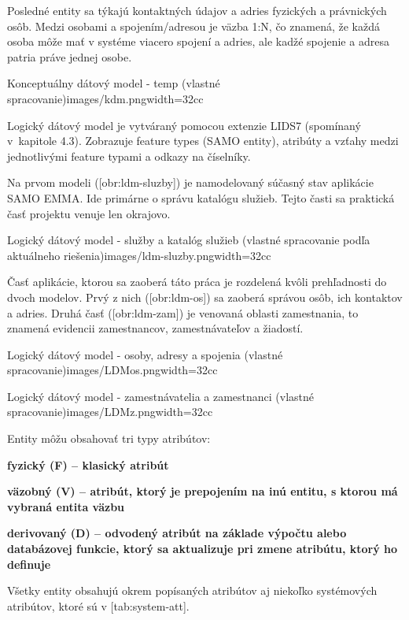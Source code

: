 Posledné entity sa týkajú kontaktných údajov a adries fyzických a právnických osôb. Medzi osobami a spojením/adresou je väzba 1:N, čo znamená, že každá osoba môže mať v systéme viacero spojení a adries, ale kadžé spojenie a adresa patria práve jednej osobe.


{Konceptuálny dátový model - temp (vlastné spracovanie)}{images/kdm.png}{width=32cc}

Logický dátový model je vytváraný pomocou extenzie LIDS7 (spomínaný v~kapitole 4.3). Zobrazuje feature types (SAMO entity), atribúty a vzťahy medzi jednotlivými feature typami a odkazy na číselníky.

Na prvom modeli ([obr:ldm-sluzby]) je namodelovaný súčasný stav aplikácie SAMO EMMA. Ide primárne o správu katalógu služieb. Tejto časti sa praktická časť projektu venuje len okrajovo.

{Logický dátový model - služby a katalóg služieb (vlastné spracovanie podľa aktuálneho riešenia)}{images/ldm-sluzby.png}{width=32cc}

Časť aplikácie, ktorou sa zaoberá táto práca je rozdelená kvôli prehľadnosti do dvoch modelov. Prvý z nich ([obr:ldm-os]) sa zaoberá správou osôb, ich kontaktov a adries. Druhá časť ([obr:ldm-zam]) je venovaná oblasti zamestnania, to znamená evidencii zamestnancov, zamestnávateľov a žiadostí.

{Logický dátový model - osoby, adresy a spojenia (vlastné spracovanie)}{images/LDMos.png}{width=32cc}

{Logický dátový model - zamestnávatelia a zamestnanci (vlastné spracovanie)}{images/LDMz.png}{width=32cc}


Entity môžu obsahovať tri typy atribútov:

\startitemize
\item {\start\bf fyzický (F) \stop -- klasický atribút}
\item {\start\bf väzobný (V) \stop -- atribút, ktorý je prepojením na inú entitu, s ktorou má vybraná entita väzbu}
\item {\start\bf derivovaný (D) \stop -- odvodený atribút na základe výpočtu alebo databázovej funkcie, ktorý sa aktualizuje pri zmene atribútu, ktorý ho definuje}
\stopitemize

Všetky entity obsahujú okrem popísaných atribútov aj niekoľko systémových atribútov, ktoré sú v [tab:system-att].



